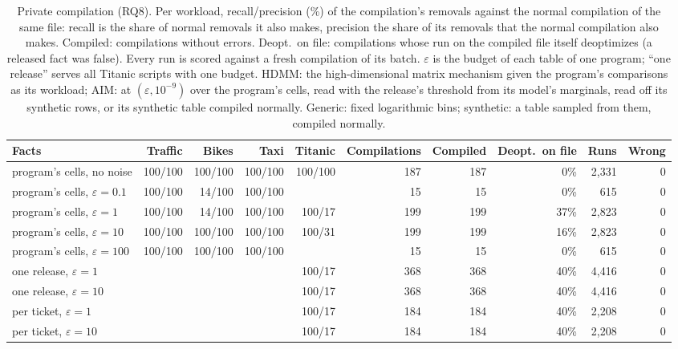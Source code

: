 \begin{table}[t]
\caption{Private compilation (RQ8). Per workload, recall/precision (\%) of the compilation's removals against the normal compilation of the same file: recall is the share of normal removals it also makes, precision the share of its removals that the normal compilation also makes. Compiled: compilations without errors. Deopt.\ on file: compilations whose run on the compiled file itself deoptimizes (a released fact was false). Every run is scored against a fresh compilation of its batch. $\varepsilon$ is the budget of each table of one program; ``one release'' serves all Titanic scripts with one budget. HDMM: the high-dimensional matrix mechanism given the program's comparisons as its workload; AIM: at $(\varepsilon, 10^{-9})$ over the program's cells, read with the release's threshold from its model's marginals, read off its synthetic rows, or its synthetic table compiled normally. Generic: fixed logarithmic bins; synthetic: a table sampled from them, compiled normally.}
\label{tab:rq-private}
\centering
\footnotesize
\begin{adjustbox}{max width=\linewidth}
\begin{tabular}{@{}lrrrrrrrrr@{}}
\toprule
Facts & Traffic & Bikes & Taxi & Titanic & Compilations & Compiled & Deopt.\ on file & Runs & Wrong \\
\midrule
program's cells, no noise & 100/100 & 100/100 & 100/100 & 100/100 & 187 & 187 & 0\% & 2,331 & 0 \\
program's cells, $\varepsilon = 0.1$ & 100/100 & 14/100 & 100/100 &  & 15 & 15 & 0\% & 615 & 0 \\
program's cells, $\varepsilon = 1$ & 100/100 & 14/100 & 100/100 & 100/17 & 199 & 199 & 37\% & 2,823 & 0 \\
program's cells, $\varepsilon = 10$ & 100/100 & 100/100 & 100/100 & 100/31 & 199 & 199 & 16\% & 2,823 & 0 \\
program's cells, $\varepsilon = 100$ & 100/100 & 100/100 & 100/100 &  & 15 & 15 & 0\% & 615 & 0 \\
one release, $\varepsilon = 1$ &  &  &  & 100/17 & 368 & 368 & 40\% & 4,416 & 0 \\
one release, $\varepsilon = 10$ &  &  &  & 100/17 & 368 & 368 & 40\% & 4,416 & 0 \\
per ticket, $\varepsilon = 1$ &  &  &  & 100/17 & 184 & 184 & 40\% & 2,208 & 0 \\
per ticket, $\varepsilon = 10$ &  &  &  & 100/17 & 184 & 184 & 40\% & 2,208 & 0 \\

\end{tabular}
\end{adjustbox}
\end{table}
